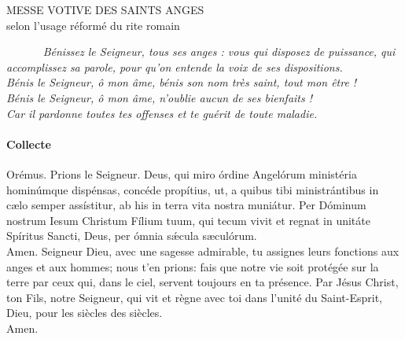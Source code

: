 \documentclass[twoside]{article}
\begin{document}
\null \newpage

\sloppy

\begin{center}\begin{doublespace}
{
\MakeUppercase{\Large Messe votive des saints anges}\\
selon l'usage réformé du rite romain
}
\end{doublespace}\end{center}



~~~~~~
\emph{\rr Bénissez le Seigneur, tous ses anges : vous qui disposez de puissance, qui accomplissez sa parole, pour qu’on entende la voix de ses dispositions.\\
\vv {} Bénis le Seigneur, ô mon âme, bénis son nom très saint, tout mon être !\\
\vv {} Bénis le Seigneur, ô mon âme, n'oublie aucun de ses bienfaits !\\
\vv {} Car il pardonne toutes tes offenses et te guérit de toute maladie.}


\pagebreak

\paragraph{Collecte}

\begin{paracol}{2}
\vv Orémus.
\switchcolumn
\vv Prions le Seigneur.
\switchcolumn*
Deus, qui miro órdine
Angelórum ministéria hominúmque dispénsas,
concéde propítius,
ut, a quibus tibi ministrántibus in cælo semper assístitur,
ab his in terra vita nostra muniátur.
Per Dóminum nostrum Iesum Christum Fílium
tuum, qui tecum vivit et regnat in unitáte Spíritus Sancti, Deus, per ómnia
sǽcula sæculórum.\\
\rr Amen.
\switchcolumn
Seigneur Dieu,
avec une sagesse admirable,
tu assignes leurs fonctions aux anges et aux hommes;
nous t'en prions:
fais que notre vie soit protégée sur la terre
par ceux qui, dans le ciel,
servent toujours en ta présence.
Par Jésus Christ, ton Fils, notre Seigneur,
qui vit et règne avec toi dans l'unité du Saint-Esprit,
Dieu, pour les siècles des siècles.\\
\rr Amen.
\end{paracol}
\end{document}
